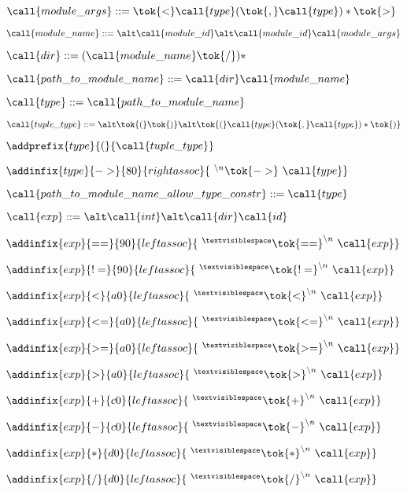  
   \item $\call{module\_args} ::=
   \tok{<} \call{type} (\tok{,} \call{type})* \tok{>}$
   
 
   \item $\call{module\_name} ::= \\
   \alt \call{module\_id} \\
   \alt \call{module\_id}\call{module\_args}$
    
 
   \item $\call{dir} ::= (\call{module\_name} \tok{/})*$
   \item $\call{path\_to\_module\_name} ::=  \call{dir}\call{module\_name}$
   

  \item $\call{type} ::= \call{path\_to\_module\_name}$
   
 
   \item $\call{tuple\_type} ::= \\
    \alt \tok{(}\tok{)}\\
    \alt \tok{(} \call{type} (\tok{,} \call{type})* \tok{)}$
   \item $\addprefix{type}{(}{\call{tuple\_type}}$
    

  \item $\addinfix{type}{->}{80}{rightassoc}{
  {}^{\ \backslash{}n}\tok{->}\ \call{type}}$


  \item $\call{path\_to\_module\_name\_allow\_type\_constr} ::= \call{type}$
  

  \item $\call{exp} ::=\\
  \alt \call{int}\\
  \alt \call{dir}\call{id}$
   

  \item $\addinfix{exp}{==}{90}{leftassoc}{
  \ {{}^\textvisiblespace}\tok{==}^{\backslash{}n}\  \call{exp}}$
  \item $\addinfix{exp}{!=}{90}{leftassoc}{
  \ {{}^\textvisiblespace}\tok{!=}^{\backslash{}n}\  \call{exp}}$
  \item $\addinfix{exp}{<}{a0}{leftassoc}{
  \ {{}^\textvisiblespace}\tok{<}^{\backslash{}n}\  \call{exp}}$
  \item $\addinfix{exp}{<=}{a0}{leftassoc}{
  \ {{}^\textvisiblespace}\tok{<=}^{\backslash{}n}\  \call{exp}}$
  \item $\addinfix{exp}{>=}{a0}{leftassoc}{
  \ {{}^\textvisiblespace}\tok{>=}^{\backslash{}n}\  \call{exp}}$
  \item $\addinfix{exp}{>}{a0}{leftassoc}{
  \ {{}^\textvisiblespace}\tok{>}^{\backslash{}n}\  \call{exp}}$
  \item $\addinfix{exp}{+}{c0}{leftassoc}{
  \ {{}^\textvisiblespace}\tok{+}^{\backslash{}n}\  \call{exp}}$
  \item $\addinfix{exp}{-}{c0}{leftassoc}{
  \ {{}^\textvisiblespace}\tok{-}^{\backslash{}n}\  \call{exp}}$
  \item $\addinfix{exp}{*}{d0}{leftassoc}{
  \ {{}^\textvisiblespace}\tok{*}^{\backslash{}n}\  \call{exp}}$
  \item $\addinfix{exp}{/}{d0}{leftassoc}{
  \ {{}^\textvisiblespace}\tok{/}^{\backslash{}n}\  \call{exp}}$
   
